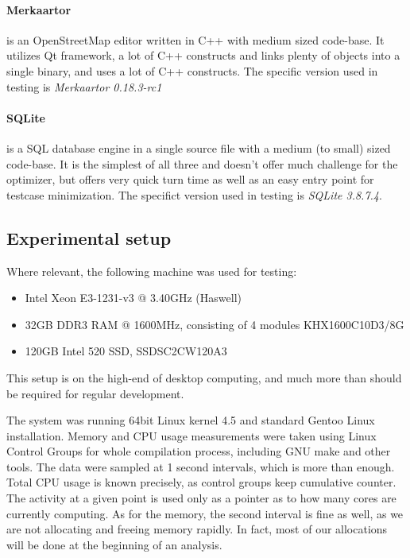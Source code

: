 \paragraph{Merkaartor} is an OpenStreetMap editor written in C++ with medium
sized code-base. It utilizes Qt framework, a lot of C++ constructs and links
plenty of objects into a single binary, and uses a lot of C++ constructs.  The
specific version used in testing is {\it Merkaartor 0.18.3-rc1}

\paragraph{SQLite} is a SQL database engine in a single source file with a
medium (to small) sized code-base. It is the simplest of all three and doesn't
offer much challenge for the optimizer, but offers very quick turn time as well
as an easy entry point for testcase minimization. The specifict version used in
testing is {\it SQLite 3.8.7.4}.

\subsection{Experimental setup}

Where relevant, the following machine was used for testing:

\begin{itemize}
	\item Intel Xeon E3-1231-v3 @ 3.40GHz (Haswell)
	\item 32GB DDR3 RAM @ 1600MHz, consisting of 4 modules KHX1600C10D3/8G
	\item 120GB Intel 520 SSD, SSDSC2CW120A3
\end{itemize}

This setup is on the high-end of desktop computing, and much more than
should be required for regular development. 

The system was running 64bit Linux kernel 4.5 and standard Gentoo Linux
installation. Memory and CPU usage measurements were taken using Linux Control
Groups for whole compilation process, including GNU make and other tools. The
data were sampled at 1 second intervals, which is more than enough. Total CPU
usage is known precisely, as control groups keep cumulative counter. The
activity at a given point is used only as a pointer as to how many cores are
currently computing. As for the memory, the second interval is fine as well, as
we are not allocating and freeing memory rapidly. In fact, most of our
allocations will be done at the beginning of an analysis.

